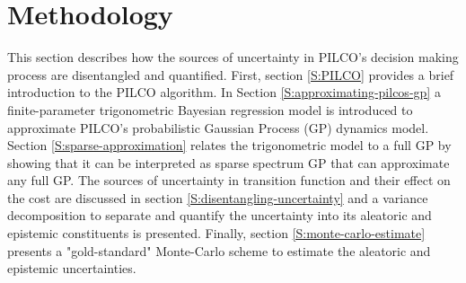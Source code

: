 
\chapter{Methodology}

\ifpdf
    \graphicspath{{Chapter2/Figs/Raster/}{Chapter2/Figs/PDF/}{Chapter2/Figs/}{Chapter2/Figures/}}
\else
    \graphicspath{{Chapter2/Figs/Vector/}{Chapter2/Figs/}{Chapter2/Figures/}}
\fi

This section describes how the sources of uncertainty in PILCO's decision making process are disentangled and quantified. First, section \ref{S:PILCO} provides a brief introduction to the PILCO algorithm. In Section \ref{S:approximating-pilcos-gp} a finite-parameter trigonometric Bayesian regression model is introduced to approximate PILCO's probabilistic Gaussian Process (GP) dynamics model. Section \ref{S:sparse-approximation} relates the trigonometric model to a full GP by showing that it can be interpreted as sparse spectrum GP that can approximate any full GP. The sources of uncertainty in transition function and their effect on the cost are discussed in section \ref{S:disentangling-uncertainty} and a variance decomposition to separate and quantify the uncertainty into its aleatoric and epistemic constituents is presented. Finally, section \ref{S:monte-carlo-estimate} presents a "gold-standard" Monte-Carlo scheme to estimate the aleatoric and epistemic uncertainties. 

